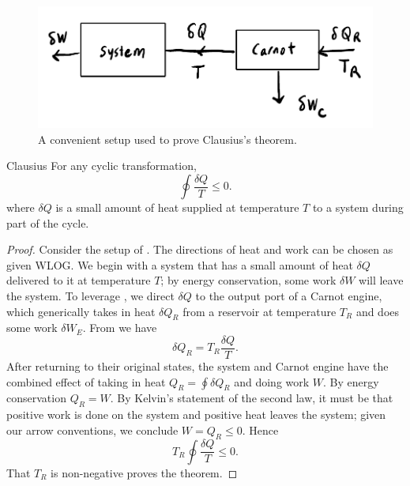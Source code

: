 \begin{figure}
\centering
\includegraphics[width=\linewidth]{figs/clausius.pdf}
\caption{A convenient setup used to prove Clausius's theorem.}
\label{fig:clausius}
\end{figure}

\begin{theorem}{Clausius}{}
For any cyclic transformation,
$$ \oint\frac{\delta Q}{T}\leq0. $$
where $\delta Q$ is a small amount of heat supplied at temperature $T$ to
a system during part of the cycle.
\begin{proof}
Consider the setup of . The directions of heat and
work can be chosen as given WLOG. We begin with a system that
has a small amount of heat $\delta Q$ delivered to it at temperature $T$; by
energy conservation, some work $\delta W$ will leave the system.
To leverage , we direct $\delta Q$ to the output port
of a Carnot engine, which generically takes in heat $\delta Q_R$ from a
reservoir at temperature $T_R$ and does some work $\delta W_E$.
From  we have
\begin{equation*}
\delta Q_R=T_R\frac{\delta Q}{T}.
\end{equation*}
After returning to their original states, the system and Carnot engine have the
combined effect of taking in heat $Q_R=\oint\delta Q_R$ and doing work $W$.
By energy conservation $Q_R=W$. By Kelvin's statement of the second law, it must
be that positive work is done on the system and positive heat leaves
the system; given our arrow conventions, we conclude $W=Q_R\leq0$. Hence
\begin{equation*}
T_R\oint\frac{\delta Q}{T}\leq0.
\end{equation*}
That $T_R$ is non-negative proves the theorem.
\end{proof}
\end{theorem}

